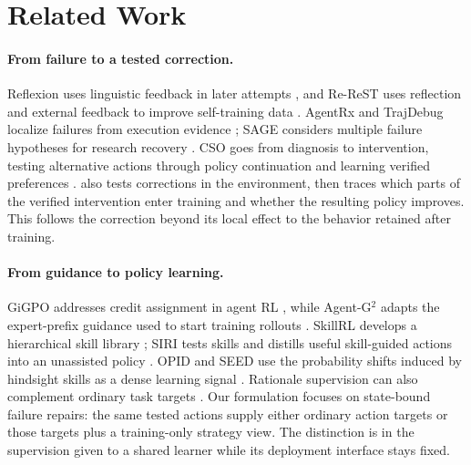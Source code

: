 \section{Related Work}
\label{sec:related}
\paragraph{From failure to a tested correction.}
Reflexion uses linguistic feedback in later attempts
\citep{shinn2023reflexion}, and Re-ReST uses reflection and external feedback
to improve self-training data \citep{dou2024rerest}. AgentRx and TrajDebug
localize failures from execution evidence \citep{barke2026agentrx,qi2026trajdebug};
SAGE considers multiple failure hypotheses for research recovery
\citep{ma2026sage}. CSO goes from diagnosis to intervention, testing
alternative actions through policy continuation and learning verified
preferences \citep{li2026cso}. \method{} also tests corrections in the
environment, then traces which parts of the verified intervention enter training and
whether the resulting policy improves. This follows the correction beyond its local effect to the behavior
retained after training.

\paragraph{From guidance to policy learning.}
GiGPO addresses credit assignment in agent RL \citep{feng2025gigpo}, while
Agent-G$^2$ adapts the expert-prefix guidance used to start training rollouts
\citep{wang2026agentg2}. SkillRL develops a hierarchical skill library
\citep{xia2026skillrl}; SIRI tests skills and distills useful skill-guided
actions into an unassisted policy \citep{he2026siri}. OPID and SEED use the
probability shifts induced by hindsight skills as a dense learning signal
\citep{yang2026opid,wu2026seed}. Rationale supervision can also complement
ordinary task targets \citep{hsieh2023distilling}. Our formulation focuses on
state-bound failure repairs: the same tested actions supply either ordinary
action targets or those targets plus a training-only strategy view.
The distinction is in the supervision given to a shared learner while its
deployment interface stays fixed.

